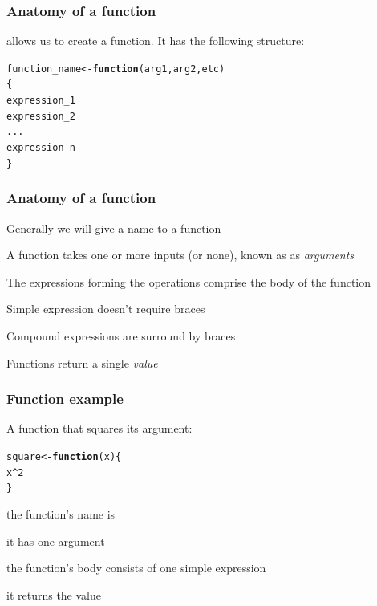 \documentclass[12pt]{beamer}\usepackage[]{graphicx}\usepackage[]{color}
\makeatletter
\newcommand{\hlnum}[1]{\textcolor[rgb]{0.686,0.059,0.569}{#1}}%
\newcommand{\hlopt}[1]{\textcolor[rgb]{0,0,0}{#1}}%
\newcommand{\hlstd}[1]{\textcolor[rgb]{0.345,0.345,0.345}{#1}}%
\newcommand{\hlkwa}[1]{\textcolor[rgb]{0.161,0.373,0.58}{\textbf{#1}}}%
\newcommand{\hlkwb}[1]{\textcolor[rgb]{0.69,0.353,0.396}{#1}}%
\newcommand{\hlkwc}[1]{\textcolor[rgb]{0.333,0.667,0.333}{#1}}%
\newenvironment{kframe}{%
 \def\at@end@of@kframe{}%
 \ifinner\ifhmode%
  \def\at@end@of@kframe{\end{minipage}}%
  \begin{minipage}{\columnwidth}%
 \fi\fi%
 \def\FrameCommand##1{\hskip\@totalleftmargin \hskip-\fboxsep
 \colorbox{shadecolor}{##1}\hskip-\fboxsep
     \hskip-\linewidth \hskip-\@totalleftmargin \hskip\columnwidth}%
 \MakeFramed {\advance\hsize-\width
   \@totalleftmargin\z@ \linewidth\hsize
   \@setminipage}}%
 {\par\unskip\endMakeFramed%
 \at@end@of@kframe}
\newenvironment{knitrout}{}{} %
\makeatother
\begin{document}
\begin{frame}[fragile]
\frametitle{Anatomy of a function}

{\hilit {}} allows us to create a function. It has the following structure:

\begin{knitrout}\footnotesize
{}\color{fgcolor}\begin{kframe}
\begin{alltt}
\hlstd{function_name} \hlkwb{<-} \hlkwa{function}\hlstd{(}\hlkwc{arg1}\hlstd{,} \hlkwc{arg2}\hlstd{,} \hlkwc{etc}\hlstd{)}
\hlstd{\{}
  \hlstd{expression_1}
  \hlstd{expression_2}
  \hlstd{...}
  \hlstd{expression_n}
\hlstd{\}}
\end{alltt}
\end{kframe}
\end{knitrout}

\end{frame}


\begin{frame}
\frametitle{Anatomy of a function}

\bi
  \item Generally we will give a name to a function
  \item A function takes one or more inputs (or none), known as as \textit{arguments}
  \item The expressions forming the operations comprise the body of the function
  \item Simple expression doesn't require braces
  \item Compound expressions are surround by braces
  \item Functions return a single \textit{value}
\ei

\end{frame}


\begin{frame}[fragile]
\frametitle{Function example}

A function that squares its argument:
\begin{knitrout}\footnotesize
{}\color{fgcolor}\begin{kframe}
\begin{alltt}
\hlstd{square} \hlkwb{<-} \hlkwa{function}\hlstd{(}\hlkwc{x}\hlstd{) \{}
  \hlstd{x}\hlopt{^}\hlnum{2}
\hlstd{\}}
\end{alltt}
\end{kframe}
\end{knitrout}

\pause
\bi
  \item the function's name is {\hilit {}}
  \item it has one argument {\hilit {}}
  \item the function's body consists of one simple expression
  \item it returns the value {\hilit {}}  
\ei

\end{frame}
\end{document}
